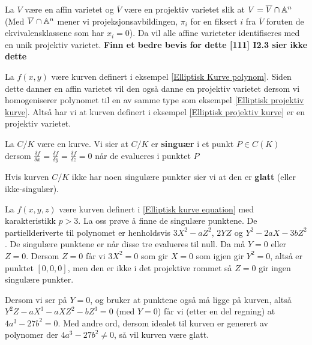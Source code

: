 \begin{proposisjon}
La $V$ være en affin varietet og $\overline{V}$ være en projektiv varietet slik at $V = \overline{V}  \cap \mathbb{A}^n$ (Med $\overline{V}  \cap \mathbb{A}^n$ mener vi projeksjonsavbildingen, $\pi_i$ for en fiksert $i$ fra $\overline{V}$ foruten de ekvivalensklassene som har $x_i = 0$).
Da vil alle affine varieteter identifiseres med en unik projektiv varietet.
\textbf{Finn et bedre bevis for dette [111] I2.3 sier ikke dette}
\end{proposisjon}

\begin{eksempel}
La $f(x,y)$ være kurven definert i eksempel \ref{Elliptisk Kurve polynom}. Siden dette danner en affin varietet vil den også danne en projektiv varietet dersom vi homogeniserer polynomet til en av samme type som eksempel \ref{Elliptisk projektiv kurve}. Altså har vi at kurven definert i eksempel \ref{Elliptisk projektiv kurve} er en projektiv varietet.
\end{eksempel}

\begin{definisjon}
La $C/K$ være en kurve. 
Vi sier at $C/K$ er \textbf{singuær} i et punkt $P \in C(K)$ dersom $ \frac{\delta f}{\delta x} = \frac{\delta f}{\delta y} = \frac{\delta f}{\delta z} = 0$ når de evalueres i punktet $P$

Hvis kurven $C/K$ ikke har noen singulære punkter sier vi at den er \textbf{glatt} (eller ikke-singulær).
\end{definisjon}

\begin{eksempel}
\label{diskriminanteksempel}
La $f(x,y,z)$ være kurven definert i \ref{Elliptisk kurve equation} med karakteristikk $p > 3$. La oss prøve å finne de singulære punktene. De partiellderiverte til polynomet er henholdsvis $3X^2 - aZ^2$, $2YZ$ og $Y^2 - 2aX - 3bZ^2$. De singulære punktene er når disse tre evalueres til null. Da må $Y = 0$ eller $Z = 0$. Dersom $Z = 0$ får vi $3X^2 = 0$ som gir $X=0$ som igjen gir $Y^2 = 0$, altså er punktet $[0,0,0]$, men den er ikke i det projektive rommet så $Z=0$ gir ingen singulære punkter.

Dersom vi ser på $Y = 0$, og bruker at punktene også må ligge på kurven, altså $Y^2Z - aX^3 - aXZ^2 - bZ^3 = 0$ (med $Y=0$) får vi (etter en del regning) at $4a^3 - 27b^2 = 0$. Med andre ord, dersom idealet til kurven er generert av polynomer der $4a^3 - 27b^2 \neq 0$, så vil kurven være glatt.
\end{eksempel}

